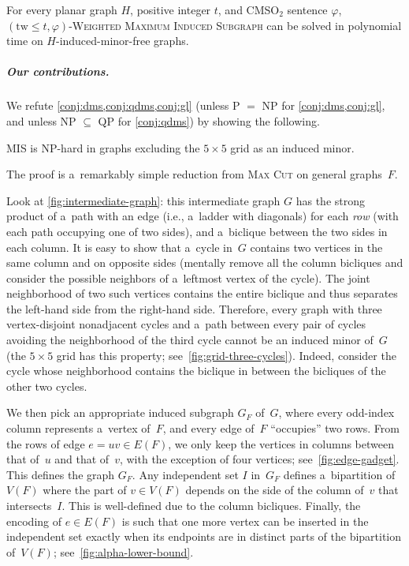 \documentclass[a4paper,UKenglish,cleveref,autoref]{lipics-v2021}
\newcommand{\cmsot}{\textsf{CMSO$_2$}\xspace}
\newcommand{\smis}{\textsc{MIS}\xspace}
\newcommand\tw{\text{tw}}
\begin{document}
\begin{conjecture}\label{conj:gl}
  For every planar graph $H$, positive integer $t$, and \cmsot sentence $\varphi$, $(\tw \leqslant t,\varphi)$-\textsc{Weighted Maximum Induced Subgraph} can be solved in polynomial time on $H$-induced-minor-free graphs.
\end{conjecture}

\subparagraph*{Our contributions.}
We refute \cref{conj:dms,conj:qdms,conj:gl} (unless P $=$ NP for \cref{conj:dms,conj:gl}, and unless NP $\subseteq$ QP for \cref{conj:qdms}) by showing the following.

\begin{theorem}\label{thm:main}
\leavevmode
\smis is NP-hard in graphs excluding the $5 \times 5$ grid as an induced minor.
\end{theorem}

The proof is a~remarkably simple reduction from \textsc{Max Cut} on general graphs~$F$.

Look at \cref{fig:intermediate-graph}: this intermediate graph $G$ has the strong product of a~path with an edge (i.e., a~ladder with diagonals) for each \emph{row} (with each path occupying one of two sides), and a~biclique between the two sides in each column.
It is easy to show that a~cycle in~$G$ contains two vertices in the same column and on opposite sides (mentally remove all the column bicliques and consider the possible neighbors of a~leftmost vertex of the cycle).
The joint neighborhood of two such vertices contains the entire biclique and thus separates the left-hand side from the right-hand side.
Therefore, every graph with three vertex-disjoint nonadjacent cycles and a~path between every pair of cycles avoiding the neighborhood of the third cycle cannot be an induced minor of~$G$ (the $5 \times 5$ grid has this property; see~\cref{fig:grid-three-cycles}).
Indeed, consider the cycle whose neighborhood contains the biclique in between the bicliques of the other two cycles.

We then pick an appropriate induced subgraph $G_F$ of~$G$, where every odd-index column represents a~vertex of~$F$, and every edge of~$F$ ``occupies'' two rows.
From the rows of edge $e=uv \in E(F)$, we only keep the vertices in columns between that of~$u$ and that of~$v$, with the exception of four vertices; see~\cref{fig:edge-gadget}.
This defines the graph $G_F$.
Any independent set $I$ in~$G_F$ defines a~bipartition of~$V(F)$ where the part of $v \in V(F)$ depends on the side of the column of~$v$ that intersects~$I$.
This is well-defined due to the column bicliques.
Finally, the encoding of $e \in E(F)$ is such that one more vertex can be inserted in the independent set exactly when its endpoints are in distinct parts of the bipartition of~$V(F)$; see~\cref{fig:alpha-lower-bound}.
\end{document}
